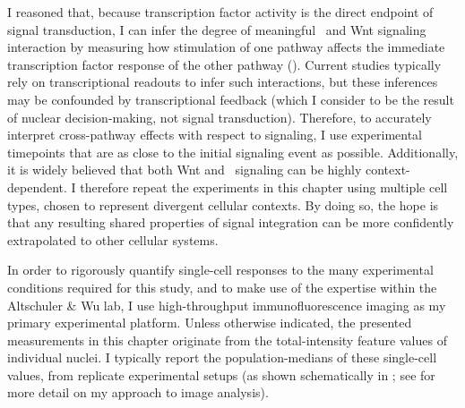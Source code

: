 I reasoned that, because transcription factor activity is
the direct endpoint of signal transduction, I can infer the
degree of meaningful \tgfbsf\ and Wnt signaling interaction by measuring
how stimulation of one pathway affects the immediate transcription factor
response of the other pathway ().
Current studies typically rely on transcriptional readouts to infer
such interactions, but these inferences may be confounded by transcriptional
feedback (which I consider to be the result of nuclear decision-making,
not signal transduction). Therefore, to accurately interpret cross-pathway effects
with respect to signaling, I use experimental timepoints that are
as close to the initial signaling event as possible.
Additionally, it is widely
believed that both Wnt and \tgfbsf\ signaling can be highly context-dependent.
I therefore repeat the experiments in this chapter using multiple
cell types, chosen to represent divergent cellular contexts.
By doing so, the hope is that any resulting shared properties of signal
integration can be more confidently extrapolated to other cellular systems.

In order to rigorously quantify single-cell responses to the
many experimental conditions required for this study,
and to make use of the expertise within the Altschuler \& Wu
lab, I use high-throughput immunofluorescence imaging as my primary
experimental platform. Unless otherwise indicated,
the presented measurements in this chapter originate from the
total-intensity feature values of individual nuclei. I typically report the
population-medians of these single-cell values, from replicate experimental
setups (as shown schematically
in ; see 
for more detail on my approach to image analysis).


